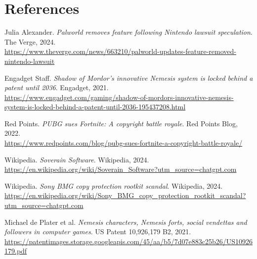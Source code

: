 \documentclass[12pt,letterpaper]{article}
\begin{document}
\section*{References}
\begin{thebibliography}{99}

Julia Alexander. \textit{Palworld removes feature following Nintendo lawsuit speculation}. The Verge, 2024.\\
\url{https://www.theverge.com/news/663210/palworld-updates-feature-removed-nintendo-lawsuit}

Engadget Staff. \textit{Shadow of Mordor’s innovative Nemesis system is locked behind a patent until 2036}. Engadget, 2021.\\
\url{https://www.engadget.com/gaming/shadow-of-mordors-innovative-nemesis-system-is-locked-behind-a-patent-until-2036-195437208.html}

Red Points. \textit{PUBG sues Fortnite: A copyright battle royale}. Red Points Blog, 2022.\\
\url{https://www.redpoints.com/blog/pubg-sues-fortnite-a-copyright-battle-royale/}

Wikipedia. \textit{Soverain Software}. Wikipedia, 2024.\\
\url{https://en.wikipedia.org/wiki/Soverain_Software?utm_source=chatgpt.com}

Wikipedia. \textit{Sony BMG copy protection rootkit scandal}. Wikipedia, 2024.\\
\url{https://en.wikipedia.org/wiki/Sony_BMG_copy_protection_rootkit_scandal?utm_source=chatgpt.com}

Michael de Plater et al. \textit{Nemesis characters, Nemesis forts, social vendettas and followers in computer games}. US Patent 10,926,179 B2, 2021.\\
\url{https://patentimages.storage.googleapis.com/45/aa/b5/7d07e883c25b26/US10926179.pdf}

\end{thebibliography}
\end{document}
